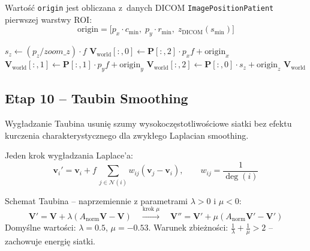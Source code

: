\documentclass[12pt,a4paper]{article}
\begin{document}
Wartość \texttt{origin} jest obliczana z~danych DICOM
\texttt{ImagePositionPatient} pierwszej warstwy ROI:
\[
  \text{origin} = \big[p_x\!\cdot\!c_{\min},\;
                       p_y\!\cdot\!r_{\min},\;
                       z_{\text{DICOM}}(s_{\min})\big]
\]

\begin{algorithm}[H]
\caption{\textsc{ToWorld} -- transformacja do układu współrzędnych world [mm]}
\label{alg:world}
\BlankLine
$s_z \leftarrow (p_z / \textit{zoom\_z}) \cdot f$\;
$\mathbf{V}_{\text{world}}[:,0] \leftarrow \mathbf{P}[:,2] \cdot p_x f + \text{origin}_x$\;
$\mathbf{V}_{\text{world}}[:,1] \leftarrow \mathbf{P}[:,1] \cdot p_y f + \text{origin}_y$\;
$\mathbf{V}_{\text{world}}[:,2] \leftarrow \mathbf{P}[:,0] \cdot s_z   + \text{origin}_z$\;
\Return $\mathbf{V}_{\text{world}}$\;
\end{algorithm}

\subsection{Etap 10 -- Taubin Smoothing}
\label{sec:taubin}

Wygładzanie Taubina \cite{taubin1995} usunię szumy wysokoczęstotliwościowe
siatki bez efektu kurczenia charakterystycznego dla zwykłego Laplacian smoothing.

Jeden krok wygładzania Laplace'a:
\[
  \mathbf{v}_i' = \mathbf{v}_i + f \, \sum_{j \in \mathcal{N}(i)}
    w_{ij} (\mathbf{v}_j - \mathbf{v}_i),
  \qquad w_{ij} = \frac{1}{\deg(i)}
\]

Schemat Taubina -- naprzemiennie z parametrami $\lambda > 0$ i $\mu < 0$:
\[
  \mathbf{V}' = \mathbf{V} + \lambda (A_{\text{norm}} \mathbf{V} - \mathbf{V})
  \quad \xrightarrow{\text{krok }\mu} \quad
  \mathbf{V}'' = \mathbf{V}' + \mu (A_{\text{norm}} \mathbf{V}' - \mathbf{V}')
\]
Domyślne wartości: $\lambda = 0.5$, $\mu = -0.53$.
Warunek zbieżności: $\frac{1}{\lambda} + \frac{1}{\mu} > 2$ -- zachowuje energię siatki.
\end{document}

